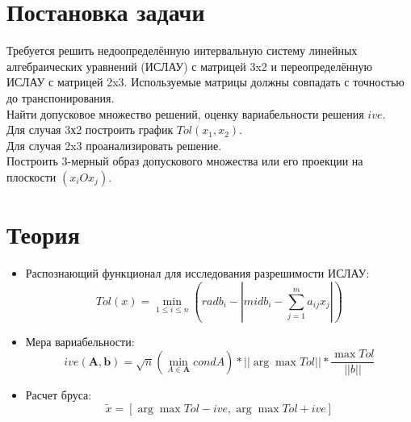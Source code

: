 
\usepackage{amsmath}

\lstset{language=Java} 




\renewcommand\contentsname{\centerline{Содержание}}
\tableofcontents
\newpage

\listoffigures
\newpage


\section{Постановка задачи}

Требуется решить недоопределённую интервальную систему линейных алгебраических уравнений (ИСЛАУ) с матрицей 3x2 и переопределённую ИСЛАУ с матрицей 2x3. Используемые матрицы должны совпадать с точностью до транспонирования. \\
Найти допусковое множество решений, оценку вариабельности решения $ive$. \\
Для случая 3х2 построить график $Tol(x_1, x_2)$. \\
Для случая 2x3 проанализировать решение. \\
Построить 3-мерный образ допускового множества или его проекции на плоскости $(x_i O x_j)$.



\section{Теория}

\begin{itemize}

	\item Распознающий функционал для исследования разрешимости ИСЛАУ:
		\begin{equation}
			Tol(x)=\min_{1 \leq i \leq n} (rad b_i - |mid b_i - \sum_{j=1}^{m}a_{ij}x_j|)
		\end{equation}
	
	\item Мера вариабельности:
		\begin{equation}
			ive(\textbf{A}, \textbf{b})= \sqrt{n} (\min_{A \in \textbf{A}} cond A) * ||\arg \max Tol || * \frac{\max Tol}{||b||}
		\end{equation}
	
	\item Расчет бруса:
		\begin{equation}
			\tilde{x} = [ \arg \max Tol - ive, \arg \max Tol + ive ]
		\end{equation}

\end{itemize}



